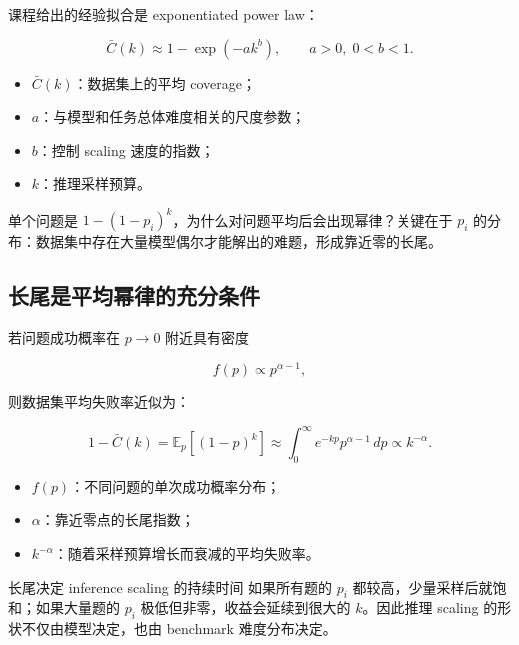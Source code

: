课程给出的经验拟合是 exponentiated power law：

$$
\bar C(k)\approx 1-\exp(-a k^b),\qquad a>0,\;0<b<1.
$$

\begin{itemize}
    \item $\bar C(k)$：数据集上的平均 coverage；
    \item $a$：与模型和任务总体难度相关的尺度参数；
    \item $b$：控制 scaling 速度的指数；
    \item $k$：推理采样预算。
\end{itemize}


单个问题是 $1-(1-p_i)^k$，为什么对问题平均后会出现幂律？关键在于 $p_i$ 的分布：数据集中存在大量模型偶尔才能解出的难题，形成靠近零的长尾。


\subsection{长尾是平均幂律的充分条件}

若问题成功概率在 $p\rightarrow0$ 附近具有密度

$$
f(p)\propto p^{\alpha-1},
$$

则数据集平均失败率近似为：

$$
1-\bar C(k)=\mathbb{E}_{p}[(1-p)^k]
\approx\int_{0}^{\infty} e^{-kp}p^{\alpha-1}\,dp
\propto k^{-\alpha}.
$$

\begin{itemize}
    \item $f(p)$：不同问题的单次成功概率分布；
    \item $\alpha$：靠近零点的长尾指数；
    \item $k^{-\alpha}$：随着采样预算增长而衰减的平均失败率。
\end{itemize}


\begin{importantbox}{长尾决定 inference scaling 的持续时间}
如果所有题的 $p_i$ 都较高，少量采样后就饱和；如果大量题的 $p_i$ 极低但非零，收益会延续到很大的 $k$。因此推理 scaling 的形状不仅由模型决定，也由 benchmark 难度分布决定。
\end{importantbox}

